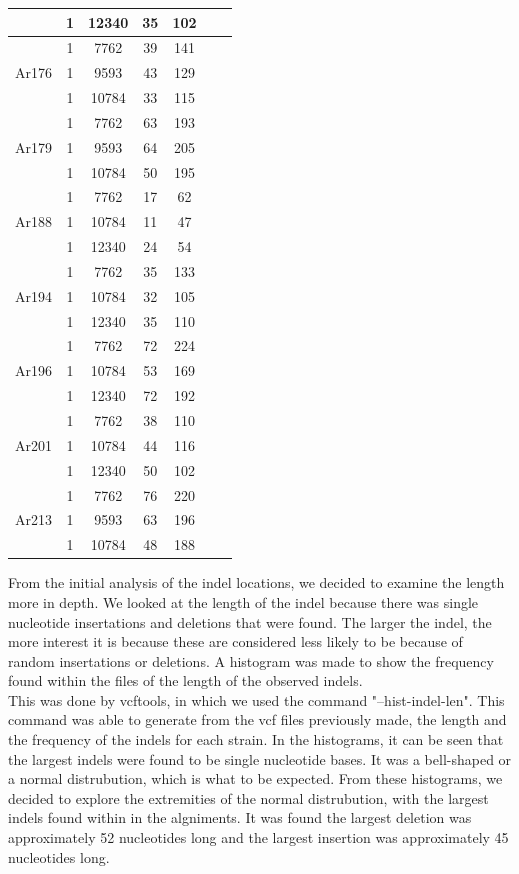 \documentclass[../main.tex]{subfiles}
\begin{document}
\begin{table}[H]
\begin{center}
\begin{singlespace}
{\begin{tabular}{ |c|c|c|c|c|c|c| }
		& 1 & 12340 & 35 & 102 \\ 
		\hline
		\multirow{3}{4em}{Ar176} & 1 & 7762 & 39 & 141 \\ 
		& 1 & 9593 & 43 & 129  \\ 
		& 1 & 10784 & 33 & 115 \\ 
		\hline
		\multirow{3}{4em}{Ar179} & 1 & 7762 & 63 & 193 \\ 
		& 1 & 9593 & 64 & 205  \\ 
		& 1 & 10784 & 50 & 195 \\ 
		\hline
		\multirow{3}{4em}{Ar188} & 1 & 7762 & 17 & 62 \\ 
		& 1 & 10784 & 11 & 47  \\ 
		& 1 & 12340 & 24 & 54 \\ 
		\hline
		\multirow{3}{4em}{Ar194} & 1 & 7762 & 35 & 133 \\ 
		& 1 & 10784 & 32 & 105  \\ 
		& 1 & 12340 & 35 & 110 \\ 
		\hline
		\multirow{3}{4em}{Ar196} & 1 & 7762 & 72 & 224 \\ 
		& 1 & 10784 & 53 & 169  \\ 
		& 1 & 12340 & 72 & 192 \\ 
		\hline
		\multirow{3}{4em}{Ar201} & 1 & 7762 & 38 & 110 \\ 
		& 1 & 10784 & 44 & 116  \\ 
		& 1 & 12340 & 50 & 102 \\ 
		\hline
		\multirow{3}{4em}{Ar213} & 1 & 7762 & 76 & 220 \\ 
		& 1 & 9593 & 63 & 196  \\ 
		& 1 & 10784 & 48 & 188 \\ 
		\hline
	\end{tabular}
	}
	\end{singlespace}
\end{center}
\end{table}
From the initial analysis of the indel locations, we decided to examine the length more in depth. We looked at the length of the indel because there was single nucleotide insertations and deletions that were found. The larger the indel, the more interest it is because these are considered less likely to be because of random insertations or deletions. A histogram was made to show the frequency found within the files of the length of the observed indels. \\
This was done by vcftools, in which we used the command "--hist-indel-len". This command was able to generate from the vcf files previously made, the length and the frequency of the indels for each strain. In the histograms, it can be seen that the largest indels were found to be single nucleotide bases. It was a bell-shaped or a normal distrubution, which is what to be expected. From these histograms, we decided to explore the extremities of the normal distrubution, with the largest indels found within in the algniments. It was found the largest deletion was approximately 52 nucleotides long and the largest insertion was approximately 45 nucleotides long. \\
\end{document}
